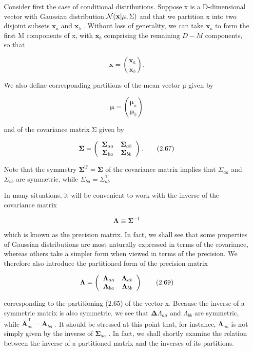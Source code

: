 \documentclass[
  10
]{article}
\begin{document}
Consider first the case of conditional distributions. Suppose x is a
D-dimensional vector with Gaussian distribution
\(\mathcal { N } ( { \bf x } | \mu , \Sigma )\) and that we partition x
into two disjoint subsets \(\mathbf { x } _ { a }\) and
\(\mathbf { x } _ { b }\) . Without loss of generality, we can take
\(\mathbf { x } _ { a }\) to form the first M components of x, with
\(\mathbf { x } _ { b }\) comprising the remaining \(D - M\) components,
so that

\[
\mathbf {x} = \binom{\mathbf {x} _ {a}}{\mathbf {x} _ {b}}.\tag{2.65}
\]

We also define corresponding partitions of the mean vector µ given by

\[
\boldsymbol {\mu} = \binom{\boldsymbol {\mu} _ {a}}{\boldsymbol {\mu} _ {b}}\tag{2.66}
\]

and of the covariance matrix Σ given by

\[
\boldsymbol {\Sigma} = \left( \begin{array}{c c} \boldsymbol {\Sigma} _ {a a} & \boldsymbol {\Sigma} _ {a b} \\ \boldsymbol {\Sigma} _ {b a} & \boldsymbol {\Sigma} _ {b b} \end{array} \right).\tag{2.67}
\]

Note that the symmetry
\(\pmb { \Sigma } ^ { \mathrm { T } } = \pmb { \Sigma }\) of the
covariance matrix implies that \(\Sigma _ { a a }\) and
\(\Sigma _ { b b }\) are symmetric, while
\(\dot { \Sigma } _ { b a } = \Sigma _ { a b } ^ { \mathrm { T } }\)

In many situations, it will be convenient to work with the inverse of
the covariance matrix

\[
\boldsymbol {\Lambda} \equiv \boldsymbol {\Sigma} ^ {- 1}\tag{2.68}
\]

which is known as the precision matrix. In fact, we shall see that some
properties of Gaussian distributions are most naturally expressed in
terms of the covariance, whereas others take a simpler form when viewed
in terms of the precision. We therefore also introduce the partitioned
form of the precision matrix

\[
\boldsymbol {\Lambda} = \left( \begin{array}{c c} \boldsymbol {\Lambda} _ {a a} & \boldsymbol {\Lambda} _ {a b} \\ \boldsymbol {\Lambda} _ {b a} & \boldsymbol {\Lambda} _ {b b} \end{array} \right)\tag{2.69}
\]

corresponding to the partitioning (2.65) of the vector x. Because the
inverse of a symmetric matrix is also symmetric, we see that
\(\mathbf { \Delta } \Lambda _ { a a }\) and \(\Lambda _ { b b }\) are
symmetric, while
\(\dot { \mathbf { A } } _ { a b } ^ { \mathrm { T } } = \mathbf { A } _ { b a }\)
. It should be stressed at this point that, for instance,
\(\pmb { \Lambda } _ { a a }\) is not simply given by the inverse of
\(\pmb { \Sigma } _ { a a }\) . In fact, we shall shortly examine the
relation between the inverse of a partitioned matrix and the inverses of
its partitions.
\end{document}

